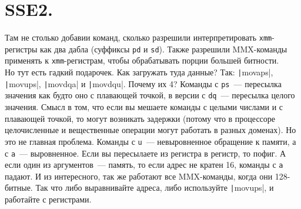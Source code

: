 \documentclass{article}
\begin{document}
    \section{SSE2.}
    Там не столько добавии команд, сколько разрешили интерпретировать \Verb|xmm|-регистры как два дабла (суффиксы \Verb|pd| и \Verb|sd|). Также разрешили MMX-команды применять к \Verb|xmm|-регистрам, чтобы обрабатывать порции большей битности.\\
    Но тут есть гадкий подарочек. Как загружать туда данные? Так: \texttt|movaps|, \texttt|movups|, \texttt|movdqa| и \texttt|movdqu|. Почему их 4? Команды с \Verb|ps|~--- пересылка значения как будто оно с плавающей точкой, в версии с \Verb|dq|~--- пересылка целого значения. Смысл в том, что если вы мешаете команды с целыми числами и с плавающей точкой, то могут возникать задержки (потому что в процессоре целочисленные и вещественные операции могут работать в разных доменах). Но это не главная проблема. Команды с \Verb|u|~--- невыровненное обращение к памяти, а с \Verb|a|~--- выровненное. Если вы пересылаете из регистра в регистр, то пофиг. А если один из аргументов~--- память, то если адрес не кратен 16, команды с \Verb|a| падают. И из интересного, так же работают все MMX-команды, когда они 128-битные. Так что либо выравнивайте адреса, либо используйте \texttt|movups|, и работайте с регистрами.
\end{document}
